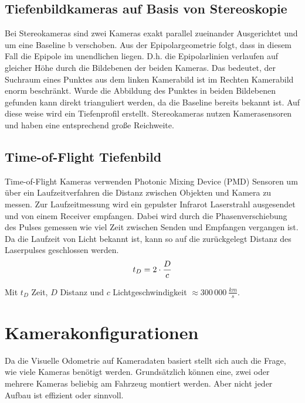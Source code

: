 \subsection{Tiefenbildkameras auf Basis von Stereoskopie}

Bei Stereokameras sind zwei Kameras exakt parallel zueinander Ausgerichtet und um eine Baseline b verschoben. Aus der Epipolargeometrie folgt, dass in diesem Fall die Epipole im unendlichen liegen. D.h. die Epipolarlinien verlaufen auf gleicher Höhe durch die Bildebenen der beiden Kameras. Das bedeutet, der Suchraum eines Punktes aus dem linken Kamerabild ist im Rechten Kamerabild enorm beschränkt. Wurde die Abbildung des Punktes in beiden Bildebenen gefunden kann direkt trianguliert werden, da die Baseline bereits bekannt ist. Auf diese weise wird ein Tiefenprofil erstellt. Stereokameras nutzen Kamerasensoren und haben eine entsprechend gro{\ss}e Reichweite. 

\subsection{Time-of-Flight Tiefenbild}

Time-of-Flight Kameras verwenden Photonic Mixing Device (PMD) Sensoren um über ein Laufzeitverfahren die Distanz zwischen Objekten und Kamera zu messen. Zur Laufzeitmessung wird ein gepulster Infrarot Laserstrahl ausgesendet und von einem Receiver empfangen. Dabei wird durch die Phasenverschiebung des Pulses gemessen wie viel Zeit zwischen Senden und Empfangen vergangen ist. Da die Laufzeit von Licht bekannt ist, kann so auf die zurückgelegt Distanz des Laserpulses geschlossen werden.
\begin{equation}
  \centering
  t_D = 2 \cdot \frac{D}{c}
\end{equation}

Mit $t_D$ Zeit, $D$ Distanz und $c$ Lichtgeschwindigkeit $\approx 300\, 000\: \frac{km}{s}$.
\newline

\section{Kamerakonfigurationen}
Da die Visuelle Odometrie auf Kameradaten basiert stellt sich auch die Frage, wie viele Kameras benötigt werden. Grundsätzlich können eine, zwei oder mehrere Kameras beliebig am Fahrzeug montiert werden. Aber nicht jeder Aufbau ist effizient oder sinnvoll.
\newline

